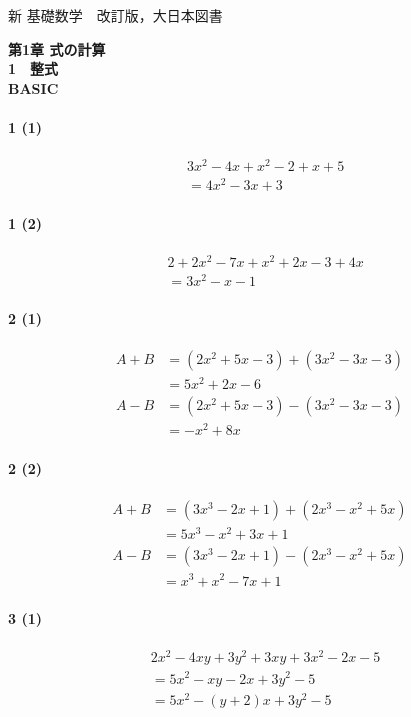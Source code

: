\documentclass[fleqn,a4j,dvipdfmx,uplatex,twocolumn]{jsarticle}
\begin{document}
\begin{flushleft}
  新 基礎数学　改訂版，大日本図書
\end{flushleft}
\begin{center}
  \textbf{第1章 式の計算}\\
  \textbf{1　整式}\\
  \textbf{BASIC}\\
\end{center}

\paragraph{1 (1)}
\begin{align*}
  & 3 x^{2}-4 x+x^{2}-2+x+5 \\
  &= 4 x^{2}-3 x+3
\end{align*}

\paragraph{1 (2)}
\begin{align*}
  & 2+2 x^{2}-7 x+x^{2}+2 x-3+4 x \\
  &= 3 x^{2}-x-1
\end{align*}

\paragraph{2 (1)}
\begin{align*}
  A+B &= \left(2 x^{2}+5 x-3\right)+\left(3 x^{2}-3 x-3\right) \\
  &= 5 x^{2}+2 x-6 \\
  A-B &= \left(2 x^{2}+5 x-3\right)-\left(3 x^{2}-3 x-3\right) \\
  &= -x^{2}+8 x
\end{align*}

\paragraph{2 (2)}
\begin{align*}
  A+B &= \left(3 x^{3}-2 x+1\right)+\left(2 x^{3}-x^{2}+5 x\right) \\
  &= 5 x^{3}-x^{2}+3 x+1 \\
  A-B &= \left(3 x^{3}-2 x+1\right)-\left(2 x^{3}-x^{2}+5 x\right) \\
  &= x^{3}+x^{2}-7 x+1
\end{align*}

\paragraph{3 (1)}
\begin{align*}
  & 2 x^{2}-4 x y+3 y^{2}+3 x y+3 x^{2}-2 x-5 \\
  &= 5 x^{2}-x y-2 x+3 y^{2}-5 \\
  &= 5 x^{2}-(y+2) x+3 y^{2}-5
\end{align*}
\end{document}
